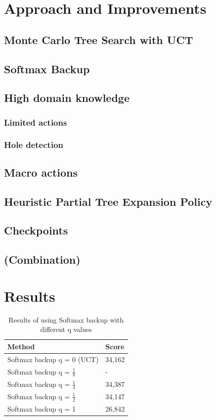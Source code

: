 \documentclass[10pt,a4paper,twoside]{article}
\begin{document}
\section{Approach and Improvements}

\subsection{Monte Carlo Tree Search with UCT}
\cite{mctssurvey}
\subsection{Softmax Backup}
\subsection{High domain knowledge}
\subsubsection{Limited actions}
\subsubsection{Hole detection}
\subsection{Macro actions}
\cite{salesman}
\subsection{Heuristic Partial Tree Expansion Policy}
\subsection{Checkpoints}

\subsection{(Combination)}

\section{Results}
\renewcommand{\arraystretch}{1.5}

\begin{table}
	\centering
\begin{tabular}[h]{| l | l |}
	\hline
	\textbf{Method} & \textbf{Score} \\ \hline
	Softmax backup q = 0 (UCT) & 34,162 \\ \hline
	Softmax backup q = $\frac{1}{8}$ & - \\ \hline
	Softmax backup q = $\frac{1}{4}$ & 34,387 \\ \hline
	Softmax backup q = $\frac{1}{2}$ & 34,147 \\ \hline
	Softmax backup q = 1 & 26,842 \\ \hline
\end{tabular}
	\caption{Results of using Softmax backup with different q values}
	\label{tab:softmax_results}
\end{table}
\end{document}
